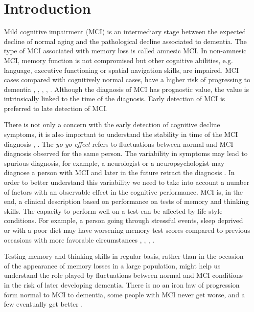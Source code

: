 \documentclass[preprint,12pt]{elsarticle}
\begin{document}
\section{Introduction}
\label{se:intro}

Mild cognitive impairment (MCI) is an intermediary stage between the expected decline of normal aging and the pathological decline associated to dementia. The type of MCI associated with memory loss is called amnesic MCI. In non-amnesic MCI, memory function is not compromised but other cognitive abilities, e.g. language, executive functioning or spatial navigation skills, are impaired. MCI cases  compared with cognitively normal cases, have a higher risk of progressing to dementia \cite{flicker1991mild}, \cite{petersen1999mild}, \cite{bruscoli2004mci}, \cite{buratti2015markers}, \cite{michaud2017risk}. Although the diagnosis of MCI has prognostic value, the value is intrinsically linked to the time of the diagnosis. Early detection of MCI is preferred to late detection of MCI. 

There is not only a concern with the early detection of cognitive decline symptoms, it is also important to understand the stability in time of the MCI diagnosis \cite{Han2012}, \cite{Ellendt2017}. The \emph{yo-yo effect} refers to fluctuations between normal and MCI diagnosis observed for the same person. The variability in symptoms may lead to spurious diagnosis, for example, a neurologist or a neuropsychologist may diagnose a person with MCI and later in the future retract the diagnosis \cite{Zonderman2013}. In order to better understand this variability we need to take into account a number of factors with an observable effect in the cognitive performance. MCI is, in the end, a clinical description based on performance on tests of memory and thinking skills. The capacity to perform well on a test can be affected by life style conditions. For example, a person going through stressful events, sleep deprived or with a poor diet may have worsening memory test scores compared to previous occasions with more favorable circumstances \cite{vecsey2015effects}, \cite{loewenstein2018utilizing}, \cite{sandi2007stress}, \cite{neupert2006daily}.

Testing memory and thinking skills in regular basis, rather than in the occasion of the appearance of memory losses in a large population, might help us understand the role played by fluctuations between normal and MCI conditions in the risk of later developing dementia. There is no an iron law of progression form normal to MCI to dementia, some people with MCI never get worse, and a few eventually get better \cite{MA}. 
\end{document}
